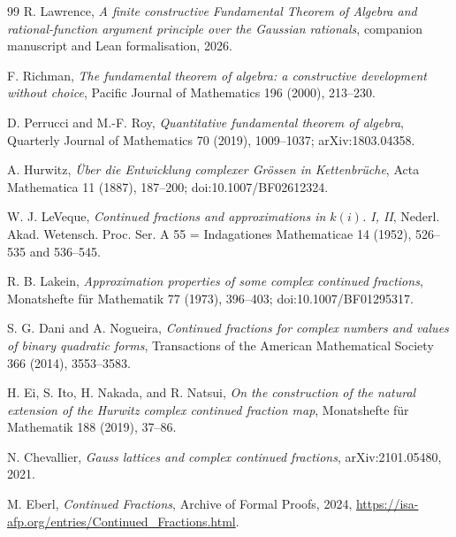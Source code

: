 \documentclass[11pt]{article}
\begin{document}
\begin{thebibliography}{99}
R. Lawrence,
\emph{A finite constructive Fundamental Theorem of Algebra and
rational-function argument principle over the Gaussian rationals},
companion manuscript and Lean formalisation, 2026.

F. Richman,
\emph{The fundamental theorem of algebra: a constructive development without
choice},
Pacific Journal of Mathematics 196 (2000), 213--230.

D. Perrucci and M.-F. Roy,
\emph{Quantitative fundamental theorem of algebra},
Quarterly Journal of Mathematics 70 (2019), 1009--1037;
arXiv:1803.04358.

A. Hurwitz,
\emph{\"Uber die Entwicklung complexer Gr\"ossen in Kettenbr\"uche},
Acta Mathematica 11 (1887), 187--200;
doi:10.1007/BF02612324.

W. J. LeVeque,
\emph{Continued fractions and approximations in $k(i)$. I, II},
Nederl. Akad. Wetensch. Proc. Ser. A 55 = Indagationes Mathematicae 14
(1952), 526--535 and 536--545.

R. B. Lakein,
\emph{Approximation properties of some complex continued fractions},
Monatshefte f\"ur Mathematik 77 (1973), 396--403;
doi:10.1007/BF01295317.

S. G. Dani and A. Nogueira,
\emph{Continued fractions for complex numbers and values of binary quadratic
forms},
Transactions of the American Mathematical Society 366 (2014), 3553--3583.

H. Ei, S. Ito, H. Nakada, and R. Natsui,
\emph{On the construction of the natural extension of the Hurwitz complex
continued fraction map},
Monatshefte f\"ur Mathematik 188 (2019), 37--86.

N. Chevallier,
\emph{Gauss lattices and complex continued fractions},
arXiv:2101.05480, 2021.

M. Eberl,
\emph{Continued Fractions},
Archive of Formal Proofs, 2024,
\url{https://isa-afp.org/entries/Continued_Fractions.html}.
\end{thebibliography}
\end{document}
